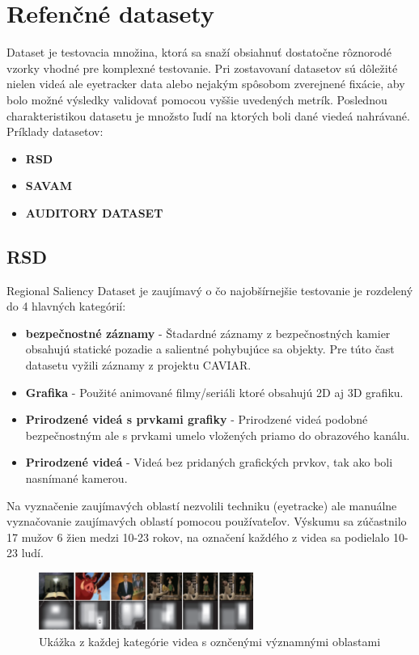 \section{Refenčné datasety}
Dataset je testovacia množina, ktorá sa snaží obsiahnuť dostatočne rôznorodé vzorky vhodné pre komplexné testovanie.
Pri zostavovaní datasetov sú dôležité nielen videá ale eyetracker data alebo nejakým spôsobom zverejnené fixácie, aby bolo možné výsledky validovať pomocou vyššie uvedených metrík.
Poslednou charakteristikou datasetu je množsto ľudí na ktorých boli dané viedeá nahrávané.
\\ Príklady datasetov:
\begin{itemize}
	\item \textbf{RSD}\cite{rsd}
	\item \textbf{SAVAM}\cite{savam}
	\item \textbf{AUDITORY DATASET}\cite{courot-dataset}
\end{itemize}

\subsection{RSD}
Regional Saliency Dataset je zaujímavý o čo najobšírnejšie testovanie je rozdelený do 4 hlavných kategórií: \\
\begin{itemize}
	\item \textbf{bezpečnostné záznamy} - Štadardné záznamy z bezpečnostných kamier obsahujú statické pozadie a salientné pohybujúce sa objekty.
Pre túto čast datasetu vyžili záznamy z projektu CAVIAR\cite{rsd-caviar}.
	\item \textbf{Grafika} - Použité animované filmy/seriáli ktoré obsahujú 2D aj 3D grafiku.
  \item \textbf{Prirodzené videá s prvkami grafiky} - Prirodzené videá  podobné bezpečnostným ale s prvkami umelo vložených priamo do obrazového kanálu.
  \item \textbf{Prirodzené videá} - Videá bez pridaných grafických prvkov, tak ako boli nasnímané kamerou.
\end{itemize}

Na vyznačenie zaujímavých oblastí nezvolili techniku (eyetracke) ale manuálne vyznačovanie zaujímavých oblastí pomocou používateľov.
Výskumu sa zúčastnilo 17 mužov 6 žien medzi 10-23 rokov, na označení každého z videa sa podielalo 10-23 ludí.

\begin{figure}[H]
 \centering
 \includegraphics[width=7cm]{pics/rsd.png}
 \caption{Ukážka z každej kategórie videa s oznčenými významnými oblastami}
\end{figure}
\vspace{10mm}

